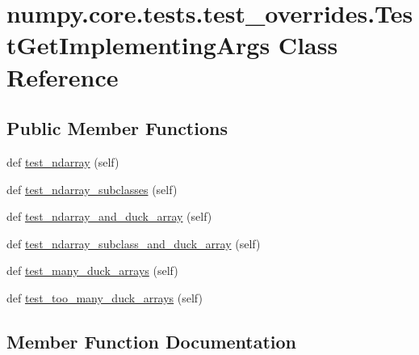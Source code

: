 \hypertarget{classnumpy_1_1core_1_1tests_1_1test__overrides_1_1TestGetImplementingArgs}{}\section{numpy.\+core.\+tests.\+test\+\_\+overrides.\+Test\+Get\+Implementing\+Args Class Reference}
\label{classnumpy_1_1core_1_1tests_1_1test__overrides_1_1TestGetImplementingArgs}
\subsection*{Public Member Functions}
\begin{DoxyCompactItemize}
\item 
def \hyperlink{classnumpy_1_1core_1_1tests_1_1test__overrides_1_1TestGetImplementingArgs_a7f8b8319310ffccf60035dbce0a29083}{test\+\_\+ndarray} (self)
\item 
def \hyperlink{classnumpy_1_1core_1_1tests_1_1test__overrides_1_1TestGetImplementingArgs_ad7343e12a5e3e058237551005ef30e12}{test\+\_\+ndarray\+\_\+subclasses} (self)
\item 
def \hyperlink{classnumpy_1_1core_1_1tests_1_1test__overrides_1_1TestGetImplementingArgs_ae0f823639a63e51035f32c3a3272dfd0}{test\+\_\+ndarray\+\_\+and\+\_\+duck\+\_\+array} (self)
\item 
def \hyperlink{classnumpy_1_1core_1_1tests_1_1test__overrides_1_1TestGetImplementingArgs_ad2c092aaaf1a243681461c5a92caec7d}{test\+\_\+ndarray\+\_\+subclass\+\_\+and\+\_\+duck\+\_\+array} (self)
\item 
def \hyperlink{classnumpy_1_1core_1_1tests_1_1test__overrides_1_1TestGetImplementingArgs_a744993b3ca5ec7e58954dd9543bcc4cb}{test\+\_\+many\+\_\+duck\+\_\+arrays} (self)
\item 
def \hyperlink{classnumpy_1_1core_1_1tests_1_1test__overrides_1_1TestGetImplementingArgs_a4e6a72e27486b18948245f7a5645f557}{test\+\_\+too\+\_\+many\+\_\+duck\+\_\+arrays} (self)
\end{DoxyCompactItemize}


\subsection{Member Function Documentation}
\mbox{\label{classnumpy_1_1core_1_1tests_1_1test__overrides_1_1TestGetImplementingArgs_a744993b3ca5ec7e58954dd9543bcc4cb}} 
